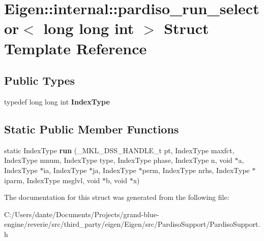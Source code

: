\hypertarget{struct_eigen_1_1internal_1_1pardiso__run__selector_3_01long_01long_01int_01_4}{}\section{Eigen\+::internal\+::pardiso\+\_\+run\+\_\+selector$<$ long long int $>$ Struct Template Reference}
\label{struct_eigen_1_1internal_1_1pardiso__run__selector_3_01long_01long_01int_01_4}
\subsection*{Public Types}
\begin{DoxyCompactItemize}
\item 
\mbox{\label{struct_eigen_1_1internal_1_1pardiso__run__selector_3_01long_01long_01int_01_4_a3d616f3f50735e26dd3900cd92f869f4}} 
typedef long long int {\bfseries Index\+Type}
\end{DoxyCompactItemize}
\subsection*{Static Public Member Functions}
\begin{DoxyCompactItemize}
\item 
\mbox{\label{struct_eigen_1_1internal_1_1pardiso__run__selector_3_01long_01long_01int_01_4_a773b269fe8ba5dbb85880add63251635}} 
static Index\+Type {\bfseries run} (\+\_\+\+M\+K\+L\+\_\+\+D\+S\+S\+\_\+\+H\+A\+N\+D\+L\+E\+\_\+t pt, Index\+Type maxfct, Index\+Type mnum, Index\+Type type, Index\+Type phase, Index\+Type n, void $\ast$a, Index\+Type $\ast$ia, Index\+Type $\ast$ja, Index\+Type $\ast$perm, Index\+Type nrhs, Index\+Type $\ast$iparm, Index\+Type msglvl, void $\ast$b, void $\ast$x)
\end{DoxyCompactItemize}


The documentation for this struct was generated from the following file\+:\begin{DoxyCompactItemize}
\item 
C\+:/\+Users/dante/\+Documents/\+Projects/grand-\/blue-\/engine/reverie/src/third\+\_\+party/eigen/\+Eigen/src/\+Pardiso\+Support/Pardiso\+Support.\+h\end{DoxyCompactItemize}
